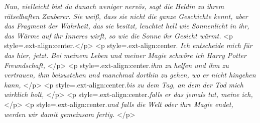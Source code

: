 \emph{\glqq Nun, vielleicht bist du danach weniger nervös\grqq{}, sagt die
Heldin zu ihrem rätselhaften Zauberer. Sie weiß, dass sie nicht die ganze
Geschichte kennt, aber das Fragment der Wahrheit, das sie besitzt, leuchtet hell
wie Sonnenlicht in ihr, das Wärme auf ihr Inneres wirft, so wie die Sonne ihr
Gesicht wärmt.} <p style=\grqq{}.ext-align:center\grqq{}.</p> <p
style=\grqq{}.ext-align:center\grqq{}.\emph{ \glqq Ich entscheide mich für das
hier, jetzt. Bei meinem Leben und meiner Magie schwöre ich Harry Potter
Freundschaft, }</p> <p style=\grqq{}.ext-align:center\grqq{}.\emph{ihm zu helfen
und ihm zu vertrauen, ihm beizustehen und manchmal dorthin zu gehen, wo er nicht
hingehen kann, }</p> <p style=\grqq{}.ext-align:center\grqq{}.\emph{bis zu dem
Tag, an dem der Tod mich wirklich holt, }</p> <p
style=\grqq{}.ext-align:center\grqq{}.\emph{falls er das jemals tut, meine ich,
}</p> <p style=\grqq{}.ext-align:center\grqq{}.\emph{und falls die Welt oder
ihre Magie endet, werden wir damit gemeinsam fertig.\grqq{} }</p>

